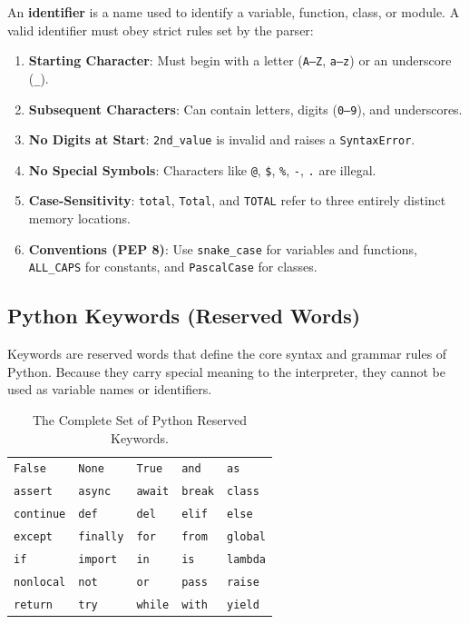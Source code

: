 \begin{conceptbox}
An \textbf{identifier} is a name used to identify a variable, function, class, or module. A valid identifier must obey strict rules set by the parser:
\begin{enumerate}[leftmargin=1.5em]
    \item \textbf{Starting Character}: Must begin with a letter (\texttt{A--Z}, \texttt{a--z}) or an underscore (\texttt{\_}).
    \item \textbf{Subsequent Characters}: Can contain letters, digits (\texttt{0--9}), and underscores.
    \item \textbf{No Digits at Start}: \texttt{2nd\_value} is invalid and raises a \texttt{SyntaxError}.
    \item \textbf{No Special Symbols}: Characters like \texttt{@}, \texttt{\$}, \texttt{\%}, \texttt{-}, \texttt{.} are illegal.
    \item \textbf{Case-Sensitivity}: \texttt{total}, \texttt{Total}, and \texttt{TOTAL} refer to three entirely distinct memory locations.
    \item \textbf{Conventions (PEP 8)}: Use \texttt{snake\_case} for variables and functions, \texttt{ALL\_CAPS} for constants, and \texttt{PascalCase} for classes.
\end{enumerate}
\end{conceptbox}

\subsection{Python Keywords (Reserved Words)}

Keywords are reserved words that define the core syntax and grammar rules of Python. Because they carry special meaning to the interpreter, they cannot be used as variable names or identifiers.

\begin{table}[htbp]
\centering
\small
\renewcommand{\arraystretch}{1.2}
\begin{tabularx}{\linewidth}{XXXXX}
\toprule
\texttt{False} & \texttt{None} & \texttt{True} & \texttt{and} & \texttt{as} \\
\texttt{assert} & \texttt{async} & \texttt{await} & \texttt{break} & \texttt{class} \\
\texttt{continue} & \texttt{def} & \texttt{del} & \texttt{elif} & \texttt{else} \\
\texttt{except} & \texttt{finally} & \texttt{for} & \texttt{from} & \texttt{global} \\
\texttt{if} & \texttt{import} & \texttt{in} & \texttt{is} & \texttt{lambda} \\
\texttt{nonlocal} & \texttt{not} & \texttt{or} & \texttt{pass} & \texttt{raise} \\
\texttt{return} & \texttt{try} & \texttt{while} & \texttt{with} & \texttt{yield} \\
\bottomrule
\end{tabularx}
\caption{The Complete Set of Python Reserved Keywords.}
\label{tab:python-keywords}
\end{table}

